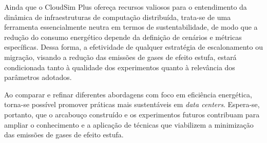 \documentclass[12pt]{article}
\begin{document}
Ainda que o CloudSim Plus ofereça recursos valiosos para o entendimento da dinâmica de infraestruturas de computação distribuída, trata-se de uma ferramenta essencialmente neutra em termos de sustentabilidade, de modo que a redução do consumo energético depende da definição de cenários e métricas específicas. Dessa forma, a efetividade de qualquer estratégia de escalonamento ou migração, visando a redução das emissões de gases de efeito estufa, estará condicionada tanto à qualidade dos experimentos quanto à relevância dos parâmetros adotados.

Ao comparar e refinar diferentes abordagens com foco em eficiência energética, torna-se possível promover práticas mais sustentáveis em \textit{data centers}. Espera-se, portanto, que o arcabouço construído e os experimentos futuros contribuam para ampliar o conhecimento e a aplicação de técnicas que viabilizem a minimização das emissões de gases de efeito estufa.

\renewcommand{\refname}{Referências}


\end{document}
